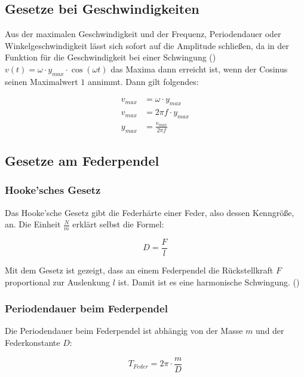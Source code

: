 \subsection{Gesetze bei Geschwindigkeiten}

Aus der maximalen Geschwindigkeit und der Frequenz, Periodendauer oder Winkelgeschwindigkeit lässt sich sofort auf die Amplitude schließen, da in der Funktion für die Geschwindigkeit bei einer Schwingung () $v(t)=\omega \cdot y_{max} \cdot \cos{(\omega t)}$ das Maxima dann erreicht ist, wenn der Cosinus seinen Maximalwert $1$ annimmt. Dann gilt folgendes:

\begin{align*} \label{eq:geschwindigkeit_amplitude}
	v_{max} &= \omega \cdot y_{max} \\
	v_{max} &= 2\pi f \cdot y_{max} \\
	y_{max} &= \frac{v_{max}}{2\pi f}
\end{align*}


\subsection{Gesetze am Federpendel} \label{subsec:gesetze_federpendel}

\subsubsection{Hooke'sches Gesetz}

Das Hooke'sche Gesetz gibt die Federhärte einer Feder, also dessen Kenngröße, an. Die Einheit $\frac{N}{m}$ erklärt selbst die Formel:

\begin{equation*}
	D=\frac{F}{l}
\end{equation*}

Mit dem Gesetz ist gezeigt, dass an einem Federpendel die Rückstellkraft $F$ proportional zur Auslenkung $l$ ist. Damit ist es eine harmonische Schwingung. ()

\subsubsection{Periodendauer beim Federpendel}

Die Periodendauer beim Federpendel ist abhängig von der Masse $m$ und der Federkonstante $D$:

\begin{equation*}
	T_{Feder}=2\pi \cdot \frac{m}{D}
\end{equation*}

